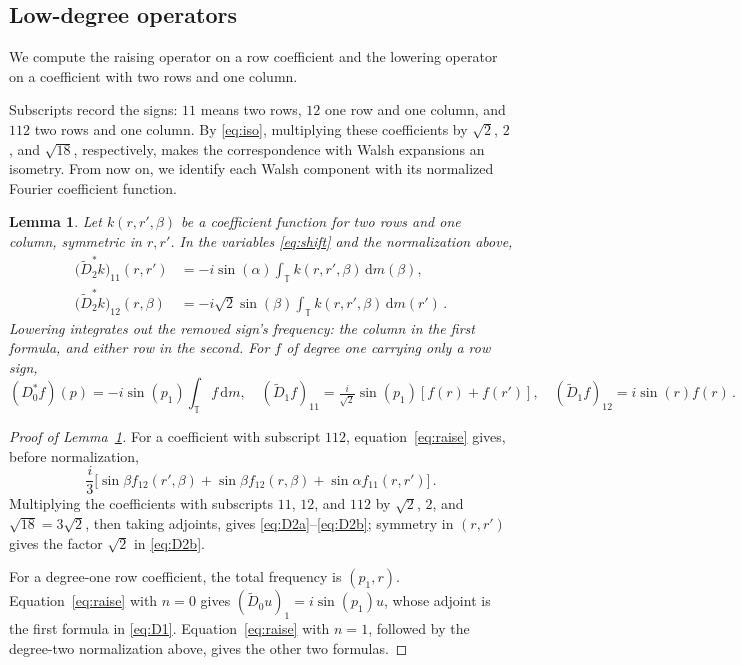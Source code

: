 \documentclass[11pt]{amsart}
\theoremstyle{plain}
\newtheorem{lemma}[theorem]{Lemma}
\theoremstyle{definition}
\newcommand{\T}{\mathbb T}
\newcommand{\1}{\mathbf 1}
\newcommand{\dd}{\,\mathrm d}
\begin{document}
\subsection{Low-degree operators}\label{ssec:low-operators}

We compute the raising operator on a row coefficient and the lowering
operator on a coefficient with two rows and one column.

Subscripts record the signs: $11$ means two rows, $12$ one row and one
column, and $112$ two rows and one column.  By \eqref{eq:iso}, multiplying
these coefficients by $\sqrt2$, $2$, and $\sqrt{18}$, respectively, makes
the correspondence with Walsh expansions an isometry.  From now on,
we identify each Walsh component with its normalized Fourier coefficient
function.

\begin{lemma}\label{lem:formulas}
Let $k(r,r',\beta)$ be a coefficient function for two rows and one column,
symmetric in $r,r'$.  In the variables \eqref{eq:shift} and the
normalization above,
\begin{align}
  \bigl(\widetilde D_2^*k\bigr)_{11}(r,r')
  &=-i\sin(\alpha)\int_\T k(r,r',\beta)\dd m(\beta),\label{eq:D2a}\\
  \bigl(\widetilde D_2^*k\bigr)_{12}(r,\beta)
  &=-i\sqrt2\sin(\beta)\int_\T k(r,r',\beta)\dd m(r')\, .\label{eq:D2b}
\end{align}
Lowering integrates out the removed sign's frequency: the column in the
first formula, and either row in the second.
For $f$ of degree one carrying only a row sign,
\begin{equation}\label{eq:D1}
  (D_0^*f)(p)=-i\sin (p_1)\int_\T f\dd m,\quad
  (\widetilde D_1f)_{11}=\tfrac i{\sqrt2}\sin (p_1)[f(r)+f(r')],\quad
  (\widetilde D_1f)_{12}=i\sin (r)f(r)\, .
\end{equation}
\end{lemma}

\begin{proof}[Proof of Lemma~\ref{lem:formulas}]
For a coefficient with subscript $112$, equation~\eqref{eq:raise} gives, before
normalization,
\[
  \frac i3\bigl[\sin\beta f_{12}(r',\beta)
  +\sin\beta f_{12}(r,\beta)+\sin\alpha f_{11}(r,r')\bigr]\, .
\]
Multiplying the coefficients with subscripts $11$, $12$, and $112$ by
$\sqrt2$, $2$, and $\sqrt{18}=3\sqrt2$, then taking adjoints, gives
\eqref{eq:D2a}--\eqref{eq:D2b}; symmetry in $(r,r')$ gives the factor
$\sqrt2$ in \eqref{eq:D2b}.

For a degree-one row coefficient, the total frequency is $(p_1,r)$.
Equation~\eqref{eq:raise} with $n=0$ gives
$(\widetilde D_0u)_1=i\sin(p_1)u$, whose adjoint is the first formula in
\eqref{eq:D1}.  Equation~\eqref{eq:raise} with $n=1$, followed by the
degree-two normalization above, gives the other two formulas.
\end{proof}
\end{document}
